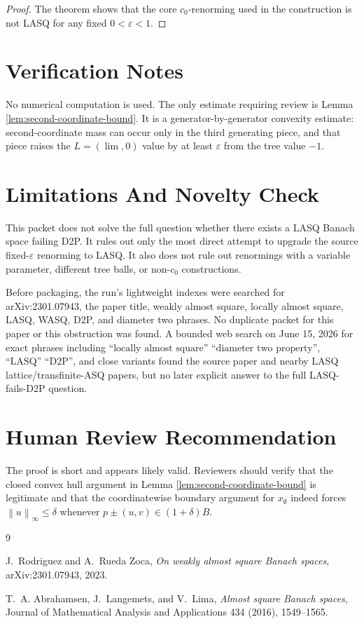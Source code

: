 \documentclass[11pt]{article}
\newcommand{\eps}{\varepsilon}
\newcommand{\norm}[1]{\left\lVert #1 \right\rVert}
\begin{document}
\begin{proof}
The theorem shows that the core \(c_0\)-renorming used in the construction is
not LASQ for any fixed \(0<\eps<1\).
\end{proof}

\section*{Verification Notes}

No numerical computation is used.  The only estimate requiring review is
Lemma \ref{lem:second-coordinate-bound}.  It is a generator-by-generator
convexity estimate: second-coordinate mass can occur only in the third
generating piece, and that piece raises the \(L=(\lim,0)\) value by at least
\(\eps\) from the tree value \(-1\).

\section*{Limitations And Novelty Check}

This packet does not solve the full question whether there exists a LASQ
Banach space failing D2P.  It rules out only the most direct attempt to upgrade
the source fixed-\(\eps\) renorming to LASQ.  It also does not rule out
renormings with a variable parameter, different tree balls, or non-\(c_0\)
constructions.

Before packaging, the run's lightweight indexes were searched for
arXiv:2301.07943, the paper title, weakly almost square, locally almost square,
LASQ, WASQ, D2P, and diameter two phrases.  No duplicate packet for this
paper or this obstruction was found.  A bounded web search on June 15, 2026
for exact phrases including \(\text{``locally almost square''}\)
\(\text{``diameter two property''}\), \(\text{``LASQ''}\)
\(\text{``D2P''}\), and close variants found the source paper and nearby
LASQ lattice/transfinite-ASQ papers, but no later explicit answer to the full
LASQ-fails-D2P question.

\section*{Human Review Recommendation}

The proof is short and appears likely valid.  Reviewers should verify that the
closed convex hull argument in Lemma \ref{lem:second-coordinate-bound} is
legitimate and that the coordinatewise boundary argument for
\(x_\emptyset\) indeed forces \(\norm{u}_\infty\leq\delta\) whenever
\(p\pm(u,v)\in (1+\delta)B\).

\begin{thebibliography}{9}

J.~Rodriguez and A.~Rueda Zoca,
\emph{On weakly almost square Banach spaces},
arXiv:2301.07943, 2023.

T.~A. Abrahamsen, J.~Langemets, and V.~Lima,
\emph{Almost square Banach spaces},
Journal of Mathematical Analysis and Applications 434 (2016), 1549--1565.

\end{thebibliography}
\end{document}
